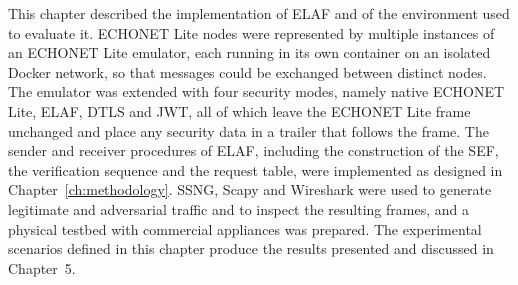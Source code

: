 This chapter described the implementation of ELAF and of the environment used to evaluate it. ECHONET Lite nodes were represented by multiple instances of an ECHONET Lite emulator, each running in its own container on an isolated Docker network, so that messages could be exchanged between distinct nodes. The emulator was extended with four security modes, namely native ECHONET Lite, ELAF, DTLS and JWT, all of which leave the ECHONET Lite frame unchanged and place any security data in a trailer that follows the frame. The sender and receiver procedures of ELAF, including the construction of the SEF, the verification sequence and the request table, were implemented as designed in Chapter~\ref{ch:methodology}. SSNG, Scapy and Wireshark were used to generate legitimate and adversarial traffic and to inspect the resulting frames, and a physical testbed with commercial appliances was prepared. The experimental scenarios defined in this chapter produce the results presented and discussed in Chapter~5.
